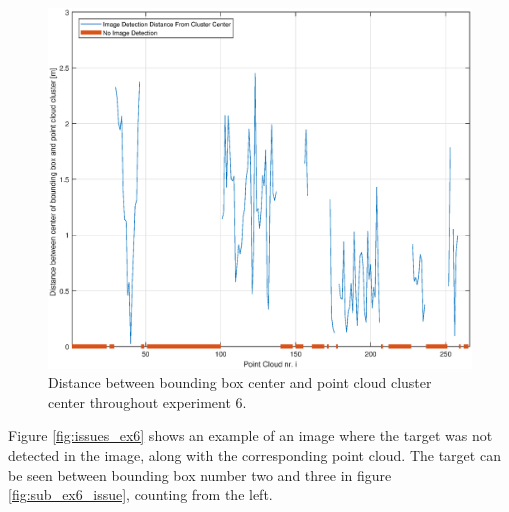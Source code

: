 \begin{figure}[H]
	\centering
	\includegraphics[width=.7\linewidth]{fig/exp_6_dist_pr_pc.eps}
	\caption{Distance between bounding box center and point cloud cluster center throughout experiment 6.}
	\label{fig:ex6_pc_dist}
\end{figure}
Figure \ref{fig:issues_ex6} shows an example of an image where the target was not detected in the image, along with the corresponding point cloud. The target can be seen between bounding box number two and three in figure \ref{fig:sub_ex6_issue}, counting from the left.
